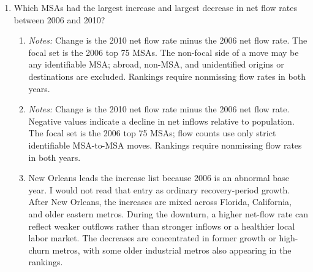 \documentclass{article}
\newcommand{\tabnote}[1]{%
\par\vspace{0.25em}
\begin{minipage}{0.92\textwidth}
\footnotesize \emph{Notes:} #1
\end{minipage}
}
\begin{document}
\begin{enumerate}[leftmargin=*]
\begin{enumerate}[label=(\roman*)]
    \item 

    New Orleans tops the gross-flow table because Katrina outflows were still enormous in 2006. 
    Baton Rouge is also likely affected by Katrina-related displacement, so I do not interpret its 2006 net inflow as a statement about the metro's ordinary attractiveness to prospective migrants.
    New Orleans' gross flow rate is 0.236, but its net flow rate is $-0.193$. Outside the Katrina-affected entries, the 2006 lists mostly pick up high-turnover and growing Sun Belt or coastal metros.
\end{enumerate}

\item Which MSAs had the largest increase and largest decrease in net flow rates between 2006 and 2010?

\begin{enumerate}[label=(\roman*)]
    \item \leavevmode

    \begin{table}[H]
    
    \caption{Top 10 increases in net flow rates, 2006 to 2010.}
    \tabnote{Change is the 2010 net flow rate minus the 2006 net flow rate. The focal set is the 2006 top 75 MSAs. The non-focal side of a move may be any identifiable MSA; abroad, non-MSA, and unidentified origins or destinations are excluded. Rankings require nonmissing flow rates in both years.}
    \end{table}

    \item \leavevmode

    \begin{table}[H]
    
    \caption{Top 10 decreases in net flow rates, 2006 to 2010.}
    \tabnote{Change is the 2010 net flow rate minus the 2006 net flow rate. Negative values indicate a decline in net inflows relative to population. The focal set is the 2006 top 75 MSAs; flow counts use only strict identifiable MSA-to-MSA moves. Rankings require nonmissing flow rates in both years.}
    \end{table}

    \item

    New Orleans leads the increase list because 2006 is an abnormal base year. I would not read that entry as ordinary recovery-period growth. After New Orleans, the increases are mixed across Florida, California, and older eastern metros. During the downturn, a higher net-flow rate can reflect weaker outflows rather than stronger inflows or a healthier local labor market. The decreases are concentrated in former growth or high-churn metros, with some older industrial metros also appearing in the rankings.
\end{enumerate}


\end{enumerate}
\end{document}

